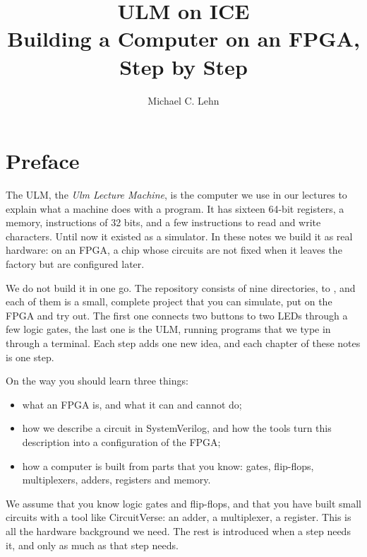 

\title{ULM on ICE\\[6pt]
       \large Building a Computer on an FPGA, Step by Step}
\author{Michael C. Lehn}
\date{}


\maketitle
\tableofcontents

\chapter*{Preface}

The ULM, the \emph{Ulm Lecture Machine}, is the computer we use in our lectures
to explain what a machine does with a program. It has sixteen 64-bit registers,
a memory, instructions of 32 bits, and a few instructions to read and write
characters. Until now it existed as a simulator. In these notes we build it as
real hardware: on an FPGA, a chip whose circuits are not fixed when it leaves
the factory but are configured later.

We do not build it in one go. The repository  consists of nine
directories,  to , and each of them is a
small, complete project that you can simulate, put on the FPGA and try out.
The first one connects two buttons to two LEDs through a few logic gates, the
last one is the ULM, running programs that we type in through a terminal. Each
step adds one new idea, and each chapter of these notes is one step.

On the way you should learn three things:
\begin{itemize}
\item what an FPGA is, and what it can and cannot do;
\item how we describe a circuit in SystemVerilog, and how the tools turn this
  description into a configuration of the FPGA;
\item how a computer is built from parts that you know: gates, flip-flops,
  multiplexers, adders, registers and memory.
\end{itemize}

We assume that you know logic gates and flip-flops, and that you have built
small circuits with a tool like CircuitVerse: an adder, a multiplexer, a
register. This is all the hardware background we need. The rest is introduced
when a step needs it, and only as much as that step needs.

